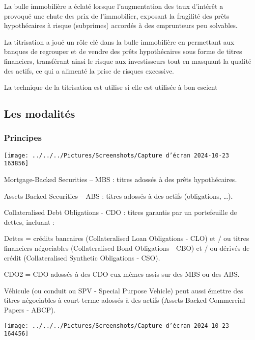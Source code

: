 \documentclass[a4paper, 12pt]{report}
\begin{document}
La bulle immobilière a éclaté lorsque l'augmentation des taux d'intérêt a provoqué une chute des prix de l'immobilier, exposant la fragilité des prêts hypothécaires à risque (subprimes) accordés à des emprunteurs peu solvables.

La titrisation a joué un rôle clé dans la bulle immobilière en permettant aux banques de regrouper et de vendre des prêts hypothécaires sous forme de titres financiers, transférant ainsi le risque aux investisseurs tout en masquant la qualité des actifs, ce qui a alimenté la prise de risques excessive.

La technique de la titrisation est utilise si elle est utilisée à bon escient

\subsection{Les modalités}

\subsubsection{Principes}

\begin{center}
	\texttt{[image: ../../../Pictures/Screenshots/Capture d'écran 2024-10-23 163856]}
\end{center}

Mortgage-Backed Securities – MBS : titres adossés à des prêts hypothécaires. 

Assets Backed Securities – ABS : titres adossés à des actifs (obligations, …). 

Collateralised Debt Obligations - CDO : titres garantis par un portefeuille de dettes, incluant : 

Dettes = crédits bancaires (Collateralised Loan Obligations - CLO) et / ou titres financiers négociables (Collateralised Bond Obligations - CBO) et / ou dérivés de crédit (Collateralised Synthetic Obligations - CSO). 

CDO2 = CDO adossés à des CDO eux-mêmes assis sur des MBS ou des ABS.

Véhicule (ou conduit ou SPV - Special Purpose Vehicle) peut aussi émettre des titres négociables à court terme adossés à des actifs (Assets Backed Commercial Papers - ABCP).

\begin{center}
	\texttt{[image: ../../../Pictures/Screenshots/Capture d'écran 2024-10-23 164456]}
\end{center}
\end{document}
